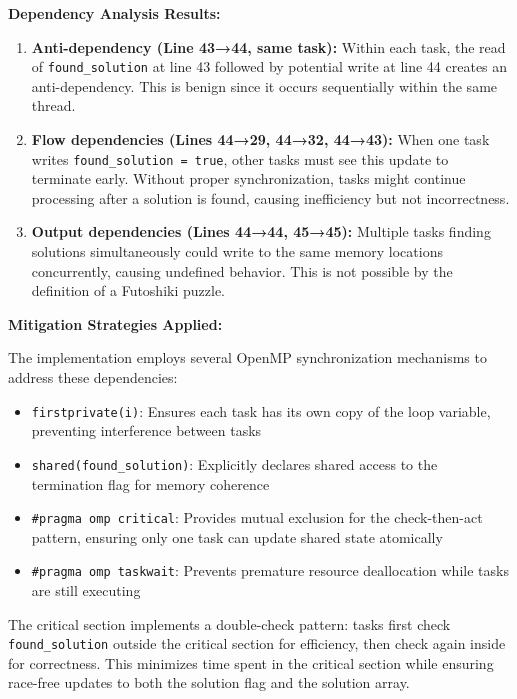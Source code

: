 \textbf{Dependency Analysis Results:}

\begin{enumerate}
    \item \textbf{Anti-dependency (Line 43→44, same task):} Within each task, the read of \texttt{found\_solution} at line 43 followed by potential write at line 44 creates an anti-dependency. This is benign since it occurs sequentially within the same thread.
    
    \item \textbf{Flow dependencies (Lines 44→29, 44→32, 44→43):} When one task writes \texttt{found\_solution = true}, other tasks must see this update to terminate early. Without proper synchronization, tasks might continue processing after a solution is found, causing inefficiency but not incorrectness.
    
    \item \textbf{Output dependencies (Lines 44→44, 45→45):} Multiple tasks finding solutions simultaneously could write to the same memory locations concurrently, causing undefined behavior. This is not possible by the definition of a Futoshiki puzzle.
\end{enumerate}

\textbf{Mitigation Strategies Applied:}

The implementation employs several OpenMP synchronization mechanisms to address these dependencies:

\begin{itemize}
    \item \texttt{firstprivate(i)}: Ensures each task has its own copy of the loop variable, preventing interference between tasks
    \item \texttt{shared(found\_solution)}: Explicitly declares shared access to the termination flag for memory coherence
    \item \texttt{\#pragma omp critical}: Provides mutual exclusion for the check-then-act pattern, ensuring only one task can update shared state atomically
    \item \texttt{\#pragma omp taskwait}: Prevents premature resource deallocation while tasks are still executing
\end{itemize}

The critical section implements a double-check pattern: tasks first check \texttt{found\_solution} outside the critical section for efficiency, then check again inside for correctness. This minimizes time spent in the critical section while ensuring race-free updates to both the solution flag and the solution array.


